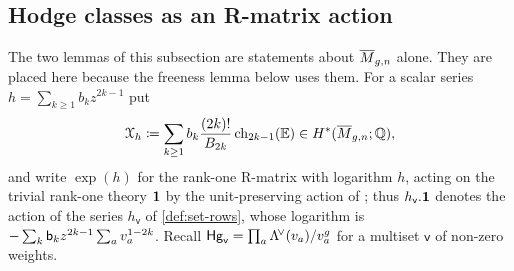 \subsection{Hodge classes as an R-matrix action}

The two lemmas of this subsection are statements about $\overline{M}_{g,n}$ alone. They are placed here because the freeness lemma below uses them. For a scalar series $h=\sum_{k\geq 1}b_kz^{2k-1}$ put
\[
\mathcal{X}_h\coloneqq\sum_{k\geq 1}b_k\frac{(2k)!}{B_{2k}}\,\mathrm{ch}_{2k-1}(\mathbb{E})\in H^*(\overline{M}_{g,n};\mathbb{Q}),
\]
and write $\exp(h)$ for the rank-one R-matrix with logarithm $h$, acting on the trivial rank-one theory $\mathbf{1}$ by the unit-preserving action of \cite[Definitions~2.2, 2.13]{PPZ15}; thus $h_{\mathsf{v}}.\mathbf{1}$ denotes the action of the series $h_{\mathsf{v}}$ of \cref{def:set-rows}, whose logarithm is $-\sum_k\mathsf{b}_kz^{2k-1}\sum_av_a^{1-2k}$. Recall $\mathsf{Hg}_{\mathsf{v}}=\prod_{a}\Lambda^{\!\vee}(v_a)/v_a^{g}$ for a multiset $\mathsf{v}$ of non-zero weights.

